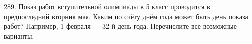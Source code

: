 289. Показ работ вступительной олимпиады в 5 класс проводится в предпоследний вторник мая. Каким по счёту днём года может быть день показа работ? Например, 1 февраля --- 32-й день года. Перечислите все возможные варианты.\\
